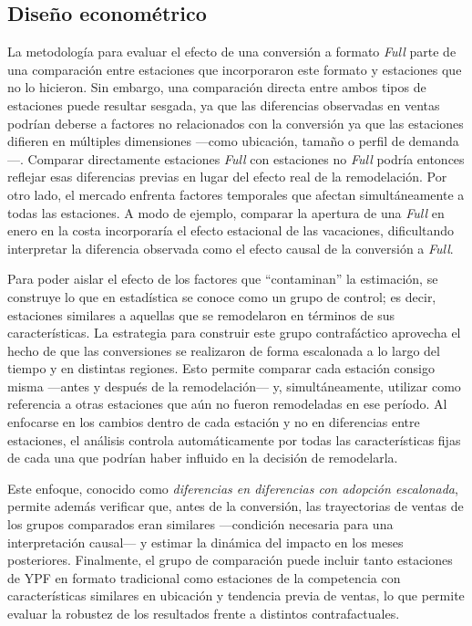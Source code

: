 \subsection{Diseño econométrico} 
La metodología para evaluar el efecto de una conversión a formato \emph{Full} parte de una comparación entre estaciones que incorporaron este formato y estaciones que no lo hicieron. Sin embargo, una comparación directa entre ambos tipos de estaciones puede resultar sesgada, ya que las diferencias observadas en ventas podrían deberse a factores no relacionados con la conversión ya que las estaciones difieren en múltiples dimensiones —como ubicación, tamaño o perfil de demanda—. Comparar directamente estaciones \emph{Full} con estaciones no \emph{Full} podría entonces reflejar esas diferencias previas en lugar del efecto real de la remodelación. Por otro lado, el mercado enfrenta factores temporales que afectan simultáneamente a todas las estaciones. A modo de ejemplo, comparar la apertura de una \emph{Full} en enero en la costa incorporaría el efecto estacional de las vacaciones, dificultando interpretar la diferencia observada como el efecto causal de la conversión a \emph{Full}.

Para poder aislar el efecto de los factores que ``contaminan'' la estimación, se construye lo que en estadística se conoce como un grupo de control; es decir, estaciones similares a aquellas que se remodelaron en términos de sus características. La estrategia para construir este grupo contrafáctico aprovecha el hecho de que las conversiones se realizaron de forma escalonada a lo largo del tiempo y en distintas regiones. Esto permite comparar cada estación consigo misma —antes y después de la remodelación— y, simultáneamente, utilizar como referencia a otras estaciones que aún no fueron remodeladas en ese período. Al enfocarse en los cambios dentro de cada estación y no en diferencias entre estaciones, el análisis controla automáticamente por todas las características fijas de cada una que podrían haber influido en la decisión de remodelarla.

Este enfoque, conocido como \emph{diferencias en diferencias con adopción escalonada}, permite además verificar que, antes de la conversión, las trayectorias de ventas de los grupos comparados eran similares —condición necesaria para una interpretación causal— y estimar la dinámica del impacto en los meses posteriores. Finalmente, el grupo de comparación puede incluir tanto estaciones de YPF en formato tradicional como estaciones de la competencia con características similares en ubicación y tendencia previa de ventas, lo que permite evaluar la robustez de los resultados frente a distintos contrafactuales.

